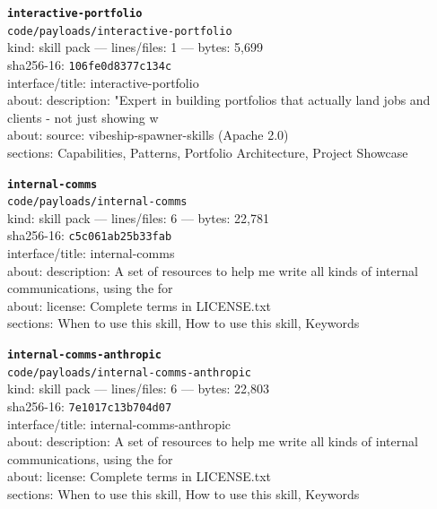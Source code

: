 \noindent\textbf{\texttt{interactive-portfolio}}\\
\texttt{code/payloads/interactive-portfolio}\\
kind: skill pack --- lines/files: 1 --- bytes: 5,699\\
sha256-16: \texttt{106fe0d8377c134c}\\
interface/title: interactive-portfolio\\
about: description: "Expert in building portfolios that actually land jobs and clients - not just showing w\\
about: source: vibeship-spawner-skills (Apache 2.0)\\
sections: Capabilities, Patterns, Portfolio Architecture, Project Showcase\\
\vspace*{6.0pt}

\noindent\textbf{\texttt{internal-comms}}\\
\texttt{code/payloads/internal-comms}\\
kind: skill pack --- lines/files: 6 --- bytes: 22,781\\
sha256-16: \texttt{c5c061ab25b33fab}\\
interface/title: internal-comms\\
about: description: A set of resources to help me write all kinds of internal communications, using the for\\
about: license: Complete terms in LICENSE.txt\\
sections: When to use this skill, How to use this skill, Keywords\\
\vspace*{6.0pt}
\newpage

\noindent\textbf{\texttt{internal-comms-anthropic}}\\
\texttt{code/payloads/internal-comms-anthropic}\\
kind: skill pack --- lines/files: 6 --- bytes: 22,803\\
sha256-16: \texttt{7e1017c13b704d07}\\
interface/title: internal-comms-anthropic\\
about: description: A set of resources to help me write all kinds of internal communications, using the for\\
about: license: Complete terms in LICENSE.txt\\
sections: When to use this skill, How to use this skill, Keywords\\
\vspace*{6.0pt}

